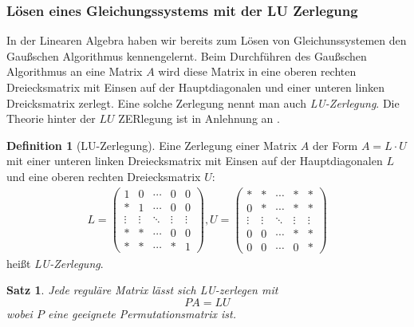\documentclass[smallheadings]{scrartcl}
\newtheorem{theorem}{Satz}
\theoremstyle{definition}
\newtheorem{definition}{Definition}[section]
\begin{document}
		\subsubsection{Lösen eines Gleichungssystems mit der LU Zerlegung}
	In der Linearen Algebra haben wir bereits zum Lösen von Gleichunssystemen den Gaußschen Algorithmus kennengelernt. Beim Durchführen des Gaußschen Algorithmus an eine Matrix $A$ wird diese Matrix in eine  oberen rechten Dreiecksmatrix mit Einsen auf der Hauptdiagonalen und einer unteren linken Dreicksmatrix zerlegt. Eine solche Zerlegung nennt man auch \textit{LU-Zerlegung}. Die Theorie hinter der $LU$ ZERlegung ist in Anlehnung an \citep{Skript}.
	\begin{definition}[LU-Zerlegung]
	Eine Zerlegung einer Matrix $A$ der Form $A=L\cdot U$ mit einer unteren linken Dreiecksmatrix mit Einsen auf der Hauptdiagonalen $L$ und eine oberen rechten Dreiecksmatrix $U$:
	\begin{align*}
	L=\begin{pmatrix}
	1&0&\cdots&0&0\\
	*&1&\cdots&0&0\\
	\vdots&\vdots&\ddots&\vdots&\vdots\\
	*&*&\cdots&0&0\\
	*&*&\cdots&*&1
	\end{pmatrix},
	U=\begin{pmatrix}
	*&*&\cdots&*&*\\
	0&*&\cdots&*&*\\
\vdots&\vdots&\ddots&\vdots&\vdots\\
	0&0&\cdots&*&*\\
	0&0&\cdots&0&*
	\end{pmatrix}
	\end{align*}
	heißt \textit{LU-Zerlegung}.
	\end{definition}
	\begin{theorem}
	Jede reguläre Matrix lässt sich LU-zerlegen mit 
	$$PA=LU$$
	wobei $P$ eine geeignete Permutationsmatrix ist. 
	\end{theorem}
\end{document}
